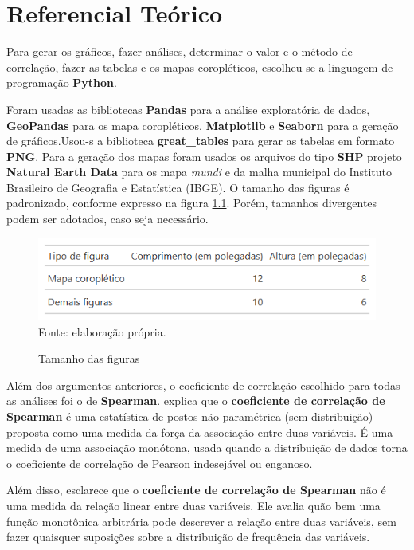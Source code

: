 \chapter{Referencial Teórico}

Para gerar os gráficos, fazer análises, determinar o valor e o método de correlação, fazer as tabelas e os mapas coropléticos, escolheu-se a linguagem de programação \textbf{Python}.

Foram usadas as bibliotecas \textbf{Pandas} para a análise exploratória de dados, \textbf{GeoPandas} para os mapa coropléticos, \textbf{Matplotlib} e \textbf{Seaborn} para a geração  de gráficos.Usou-s a biblioteca \textbf{great_tables} para gerar as tabelas em formato \textbf{PNG}. Para a geração dos mapas foram usados os arquivos do tipo \textbf{SHP} projeto \textbf{Natural Earth Data} para os mapa \textit{mundi} e da malha municipal do Instituto Brasileiro de Geografia e Estatística (IBGE). O tamanho das figuras é padronizado, conforme expresso na figura \ref{fig:tabela_tamanho_figuras}. Porém, tamanhos divergentes podem ser adotados, caso seja necessário.

\begin{figure}[H]
    \centering
    \caption{Tamanho das figuras}
    \includegraphics[width=1\linewidth]{figuras/tabela_tamanho_figuras}
    \label{fig:tabela_tamanho_figuras}
    \footnotesize{Fonte: elaboração própria.}
\end{figure}

Além dos argumentos anteriores, o coeficiente de correlação escolhido para todas as análises foi o de \textbf{Spearman}. \cite{hauke2011comparison} explica que o \textbf{coeficiente de correlação de Spearman} é uma estatística de postos não paramétrica (sem distribuição) proposta como uma medida da força da associação entre duas variáveis. É uma medida de uma associação monótona, usada quando a distribuição de dados torna o coeficiente de correlação de Pearson indesejável ou enganoso. 

Além disso, \cite{hauke2011comparison} esclarece que o \textbf{coeficiente de correlação de Spearman} não é uma medida da relação linear entre duas variáveis. Ele avalia quão bem uma função monotônica arbitrária pode descrever a relação entre duas variáveis, sem fazer quaisquer suposições sobre a distribuição de frequência das variáveis.

